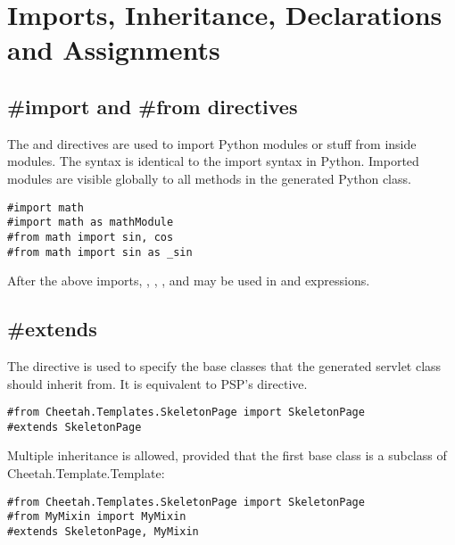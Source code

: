 \section{Imports, Inheritance, Declarations and Assignments}
\label{inheritanceEtc}


\subsection{\#import and \#from directives}
\label{inheritanceEtc.extend}

The  and  directives are used to import Python
modules or stuff from inside modules.  The syntax is identical to the import
syntax in Python.  Imported modules are visible globally to all methods in the
generated Python class.

\begin{verbatim}
#import math
#import math as mathModule
#from math import sin, cos
#from math import sin as _sin
\end{verbatim}

After the above imports, , , 
,  and  may be used in 
 and expressions.

\subsection{\#extends}
\label{inheritanceEtc.extends}

The  directive is used to specify the base classes that the
generated servlet class should inherit from.  It is equivalent to PSP's
 directive.

\begin{verbatim}
#from Cheetah.Templates.SkeletonPage import SkeletonPage
#extends SkeletonPage
\end{verbatim}

Multiple inheritance is allowed, provided that the first base class is a
subclass of Cheetah.Template.Template:

\begin{verbatim}
#from Cheetah.Templates.SkeletonPage import SkeletonPage
#from MyMixin import MyMixin
#extends SkeletonPage, MyMixin
\end{verbatim}


